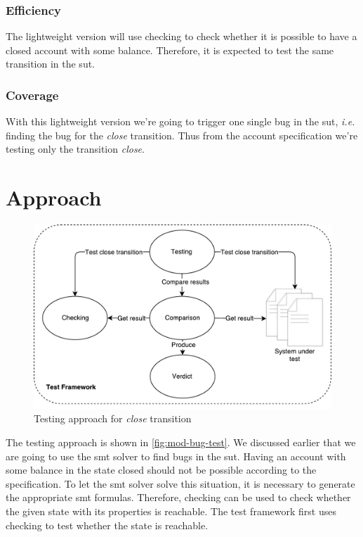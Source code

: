 \subsubsection{Efficiency}
The lightweight version will use checking to check whether it is possible to have
a closed account with some balance. Therefore, it is expected to test the same
transition in the \gls{sut}.

\subsubsection{Coverage}
With this lightweight version we're going to trigger one single bug in the \gls{sut},
\textit{i.e.} finding the bug for the \textit{close} transition. Thus from the
account specification we're testing only the transition \textit{close}.

\section{Approach}

\begin{figure}[h!]
  \centering
  \includegraphics[width=\linewidth{}]{figures/test-modified-bug.pdf}
  \caption{Testing approach for \textit{close} transition}\label{fig:mod-bug-test}
\end{figure}
\FloatBarrier

The testing approach is shown in \autoref{fig:mod-bug-test}.
We discussed earlier that we are going to use the \gls{smt} solver to find bugs in the
\gls{sut}. Having an account with some balance in the state closed should not be possible
according to the specification. To let the \gls{smt} solver solve this situation, it
is necessary to generate the appropriate \gls{smt} formulas. Therefore, checking can
be used to check whether the given state with its properties is reachable.
The test framework first uses checking to test whether the state is reachable.

